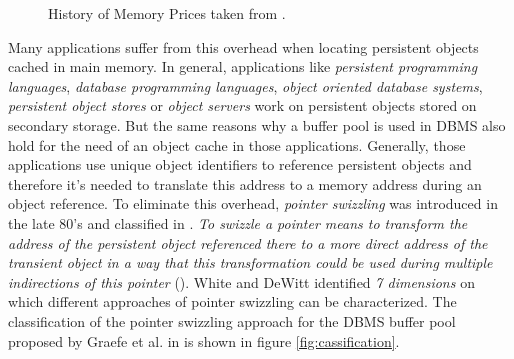 \begin{@empty}

	
	\begin{figure}[ht!]
		\centering
		\caption{History of Memory Prices taken from \cite{mempricehist}.}
		\label{fig:memorycost}
	\end{figure}
\end{@empty}

	Many applications suffer from this overhead when locating persistent objects cached in main memory. In general, applications like \textit{persistent programming languages}, \textit{database programming languages}, \textit{object oriented database systems}, \textit{persistent object stores} or \textit{object servers} work on persistent objects stored on secondary storage. But the same reasons why a buffer pool is used in DBMS also hold for the need of an object cache in those applications. Generally, those applications use unique object identifiers to reference persistent objects and therefore it's needed to translate this address to a memory address during an object reference. To eliminate this overhead, \emph{pointer swizzling} was introduced in the late 80's and classified in \cite{White:1995}. \emph{To swizzle a pointer means to transform the address of the persistent object referenced there to a more direct address of the transient object in a way that this transformation could be used during multiple indirections of this pointer} (\cite{Moss:1992}). White and DeWitt identified \emph{7 dimensions} on which different approaches of pointer swizzling can be characterized. The classification of the pointer swizzling approach for the DBMS buffer pool proposed by Graefe et al. in \cite{Graefe:2014} is shown in figure \ref{fig:cassification}.
	
